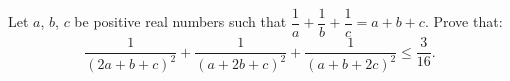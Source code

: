 Let $a$,  $b$,  $c$ be positive real numbers such that $\dfrac{1}{a} + \dfrac{1}{b} + \dfrac{1}{c} = a+b+c$. Prove that:\[\frac{1}{(2a+b+c)^2}+\frac{1}{(a+2b+c)^2}+\frac{1}{(a+b+2c)^2}\leq \frac{3}{16}.\]